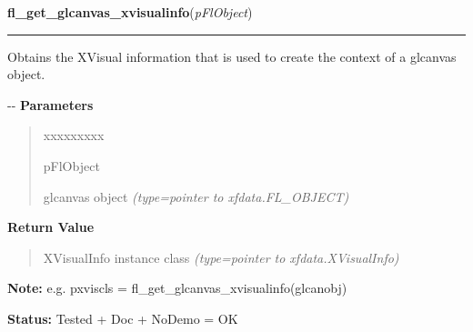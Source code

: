 \hspace{.8\funcindent}\begin{boxedminipage}{\funcwidth}

    \raggedright \textbf{fl\_get\_glcanvas\_xvisualinfo}(\textit{pFlObject})

    \vspace{-1.5ex}

    \rule{\textwidth}{0.5\fboxrule}
\setlength{\parskip}{2ex}

Obtains the XVisual information that is used to create the context of
a glcanvas object.

-{}-
\setlength{\parskip}{1ex}
      \textbf{Parameters}
      \vspace{-1ex}

      \begin{quote}
        \begin{Ventry}{xxxxxxxxx}

          \item[pFlObject]


glcanvas object
            {\it (type=pointer to xfdata.FL\_OBJECT)}

        \end{Ventry}

      \end{quote}

      \textbf{Return Value}
    \vspace{-1ex}

      \begin{quote}

XVisualInfo instance class
      {\it (type=pointer to xfdata.XVisualInfo)}

      \end{quote}

\textbf{Note:} 
e.g. pxviscls = fl\_get\_glcanvas\_xvisualinfo(glcanobj)


\textbf{Status:} 
Tested + Doc + NoDemo = OK


    \end{boxedminipage}

    \label{xformslib:flglcanvas:fl_get_glcanvas_context}

    \vspace{0.5ex}


